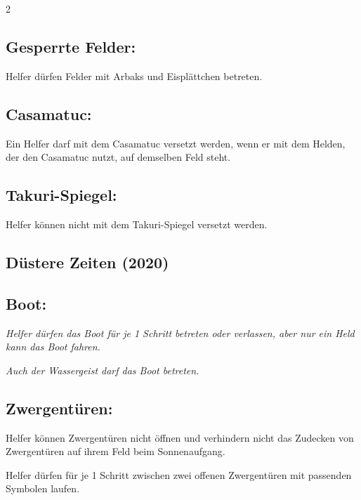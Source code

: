 \documentclass[10pt, a4paper, oneside]{book}
\newcommand{\fan}[1]{\textit{#1}}
\begin{document}
\begin{multicols*}{2}
\begin{bgcolor}[color-ag]
\subsection{Gesperrte Felder:}

Helfer dürfen Felder mit Arbaks und Eisplättchen betreten. 
\supercite{ag-begleitheft,mh-begleitheft}


\subsection{Casamatuc:}

Ein Helfer darf mit dem Casamatuc versetzt werden, wenn er mit dem Helden, der den Casamatuc nutzt, auf demselben Feld steht. 
\supercite{ag-begleitheft}

\subsection{Takuri-Spiegel:}

Helfer können nicht mit dem Takuri-Spiegel versetzt werden.
\supercite{ag-begleitheft}

\end{bgcolor}



\columnbreak


\begin{bgcolor}[color-dz]
\section{Düstere Zeiten (2020)}

\subsection{Boot:}

\fan{Helfer dürfen das Boot für je 1 Schritt betreten oder verlassen, aber nur ein Held kann das Boot fahren.}

\fan{Auch der Wassergeist darf das Boot betreten.}


\subsection{Zwergentüren:}

Helfer können Zwergentüren nicht öffnen und verhindern nicht das Zudecken von Zwergentüren auf ihrem Feld beim Sonnenaufgang.
\supercite{dz-begleitheft}

Helfer dürfen für je 1 Schritt zwischen zwei offenen Zwergentüren mit passenden Symbolen laufen.




\end{bgcolor}
\end{multicols*}
\end{document}
